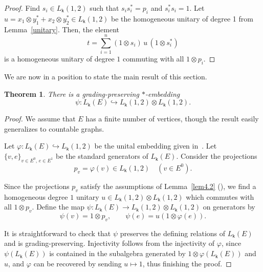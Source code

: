 \documentclass[a4paper, 11pt, reqno]{amsart}
\newtheorem{thm}{Theorem}[section]
\theoremstyle{definition}
\newcommand{\K}{\mathsf{k}}
\begin{document}
\begin{proof}
Find  $s_i \in L_\K(1,2)$ such that $s_i s_i^* = p_i$ and $s_i^* s_i = 1$.
Let $u=x_1 \otimes y_1^* + x_2 \otimes y_2^*\in L_\K(1,2)$ be the homogeneous unitary of degree 1 from Lemma~\ref{unitary}. Then, the element
\[
t = \sum_{i=1}^n (1 \otimes s_i)\, u\, (1 \otimes s_i^*)
\]
is a homogeneous unitary of degree $1$  commuting with all $1 \otimes p_i$.
\end{proof}

We are now in a position to state the main result of this section.

\begin{thm}\label{grad-embed}
There is a grading-preserving $*$-embedding
\[
\psi \colon L_{\K}(E) \hookrightarrow L_\K(1,2)\otimes L_\K(1,2).
\]
\end{thm}

\begin{proof}
We assume that $E$ has a finite number of vertices, though the result
easily generalizes to countable graphs.

Let $\varphi \colon L_{\K}(E) \hookrightarrow  L_\K(1,2)$ be the 
unital embedding given in~\cite{brownsor}. Let $\{v, e \}_{v \in E^0, \, e \in E^1}$ be the standard
generators of $L_{\K}(E)$. Consider the projections
\[
p_v = \varphi(v) \in  L_\K(1,2) \quad (v \in E^0).
\]

Since the projections $p_v$ satisfy the assumptions of Lemma~\ref{lem4.2} (\cite[Proposition 4.3]{brownsor}), we find a homogeneous degree $1$ unitary $u \in L_\K(1,2)\otimes L_\K(1,2)$ which commutes with all
$1 \otimes p_v$. Define the map $\psi \colon L_{\K}(E) \to L_\K(1,2)\otimes L_\K(1,2)$ on generators by
\[
\psi(v) = 1 \otimes p_v, \qquad
\psi(e) = u (1 \otimes \varphi(e)).
\]

It is straightforward to check that $\psi$ preserves the defining relations
of $L_{\K}(E)$ and is grading-preserving. Injectivity follows from the injectivity
of $\varphi$, since $\psi(L_{\K}(E))$ is contained in the subalgebra generated by
$1 \otimes \varphi(L_{\K}(E))$ and $u$, and $\varphi$ can be recovered by sending
$u \mapsto 1$, thus finishing the proof.
\end{proof}
\end{document}
